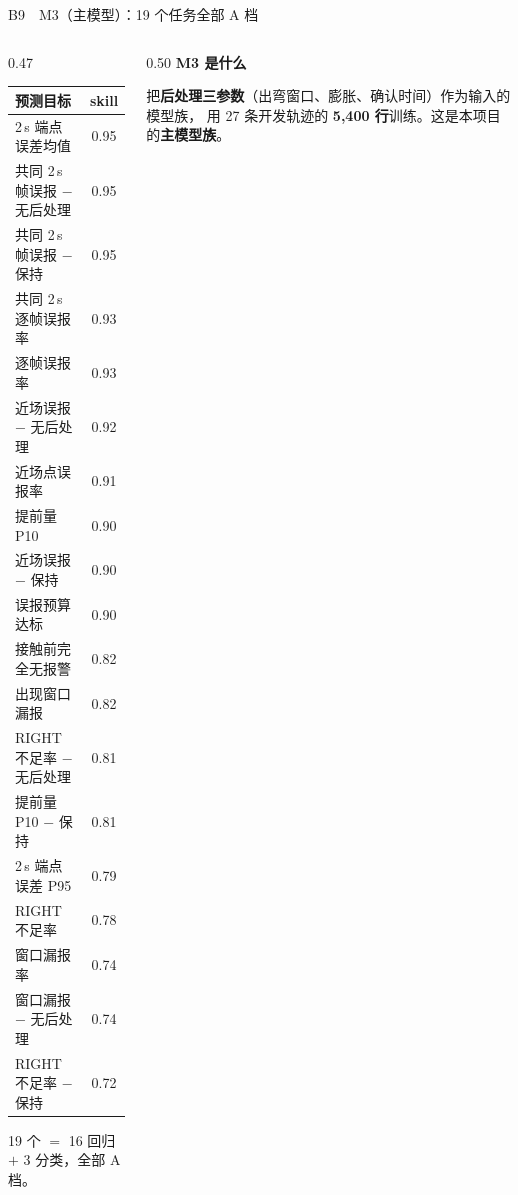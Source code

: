 \documentclass[aspectratio=169,10pt]{ctexbeamer}
\begin{document}
\begin{frame}{B9\ \ M3（主模型）：19 个任务全部 A 档}
  \vspace{-0.5em}
  \begin{columns}[T]
    \begin{column}{0.47\textwidth}
      \scriptsize
      \renewcommand{\arraystretch}{1.14}
      \begin{tabular}{@{}lc@{}}
        \toprule
        \textbf{预测目标} & \textbf{skill} \\
        \midrule
        2\,s 端点误差均值 & 0.95 \\
        共同 2\,s 帧误报 $-$ 无后处理 & 0.95 \\
        共同 2\,s 帧误报 $-$ 保持 & 0.95 \\
        共同 2\,s 逐帧误报率 & 0.93 \\
        逐帧误报率 & 0.93 \\
        近场误报 $-$ 无后处理 & 0.92 \\
        近场点误报率 & 0.91 \\
        提前量 P10 & 0.90 \\
        近场误报 $-$ 保持 & 0.90 \\
        误报预算达标 & 0.90 \\
        接触前完全无报警 & 0.82 \\
        出现窗口漏报 & 0.82 \\
        RIGHT 不足率 $-$ 无后处理 & 0.81 \\
        提前量 P10 $-$ 保持 & 0.81 \\
        2\,s 端点误差 P95 & 0.79 \\
        RIGHT 不足率 & 0.78 \\
        窗口漏报率 & 0.74 \\
        窗口漏报 $-$ 无后处理 & 0.74 \\
        RIGHT 不足率 $-$ 保持 & 0.72 \\
        \bottomrule
      \end{tabular}
      \vspace{0.4em}

      {\scriptsize\color{black!62}19 个 $=$ 16 回归 $+$ 3 分类，全部 A 档。}
    \end{column}
    \begin{column}{0.50\textwidth}
      \footnotesize
      \textbf{M3 是什么}\par
      把\textbf{后处理三参数}（出弯窗口、膨胀、确认时间）作为输入的模型族，
      用 27 条开发轨迹的 \textbf{5{,}400 行}训练。这是本项目的\textbf{主模型族}。


\end{column}
\end{columns}
\end{frame}
\end{document}
